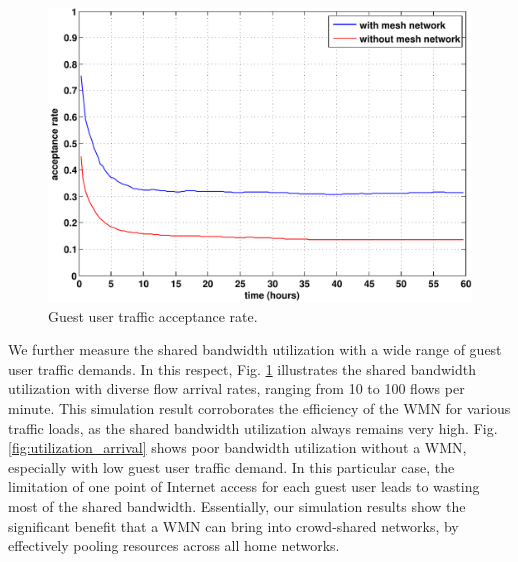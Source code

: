\begin{figure}[t]
\begin{center}
\includegraphics[width=1\linewidth]{results/acceptance_rate.pdf}
\caption{Guest user traffic acceptance rate.}
\label{fig:acceptance}
\end{center}
\end{figure}

We further measure the shared bandwidth utilization with a wide range of guest user traffic demands. In this respect, Fig. \ref{fig:acceptance} illustrates the shared bandwidth utilization with diverse flow arrival rates, ranging from 10 to 100 flows per minute. This simulation result corroborates the efficiency of the WMN for various traffic loads, as the shared bandwidth utilization always remains very high. Fig. \ref{fig:utilization_arrival} shows poor bandwidth utilization without a WMN, especially with low guest user traffic demand. In this particular case, the limitation of one point of Internet access for each guest user leads to wasting most of the shared bandwidth. Essentially, our simulation results show the significant benefit that a WMN can bring into crowd-shared networks, by effectively pooling resources across all home networks.

